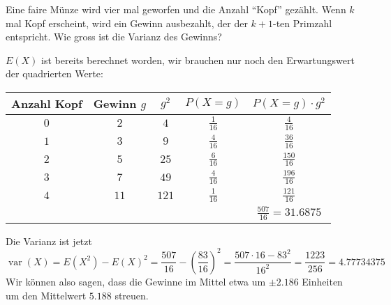 Eine faire Münze wird vier mal geworfen und die Anzahl ``Kopf'' gezählt.
Wenn $k$ mal Kopf erscheint, wird ein Gewinn ausbezahlt, der der $k+1$-ten
Primzahl entspricht. Wie gross ist die Varianz des Gewinns?

\begin{loesung}
$E(X)$ ist bereits berechnet worden, wir brauchen nur noch den
Erwartungswert der quadrierten Werte:
\begin{center}
\begin{tabular}{|c|c|c|c|c|}
\hline
Anzahl Kopf&Gewinn $g$&$g^2$&$P(X=g)$&$P(X=g)\cdot g^2$\\
\hline
$0$&$ 2$&$  4$&$\frac1{16}$&$\frac{  4}{16}$\\
$1$&$ 3$&$  9$&$\frac4{16}$&$\frac{ 36}{16}$\\
$2$&$ 5$&$ 25$&$\frac6{16}$&$\frac{150}{16}$\\
$3$&$ 7$&$ 49$&$\frac4{16}$&$\frac{196}{16}$\\
$4$&$11$&$121$&$\frac1{16}$&$\frac{121}{16}$\\
\hline
&&&&$\frac{507}{16}=31.6875$\\
\hline
\end{tabular}
\end{center}
Die Varianz ist jetzt
\[
\operatorname{var}(X)
=E(X^2)-E(X)^2
=\frac{507}{16}-\left(\frac{83}{16}\right)^2
=\frac{507\cdot 16 - 83^2}{16^2}=\frac{1223}{256}=4.77734375
\]
Wir können also sagen, dass die Gewinne im Mittel
etwa um $\pm2.186$ Einheiten um den Mittelwert $5.188$
streuen.
\end{loesung}

